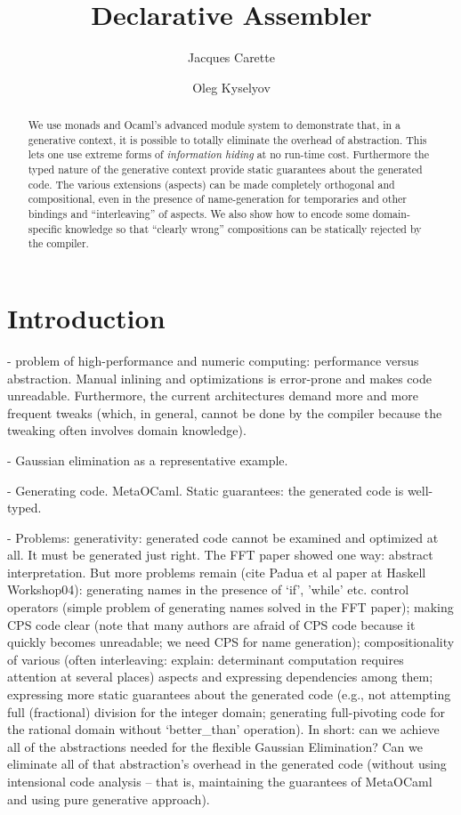 \documentclass[11pt]{llncs}
\title{Declarative Assembler}
\author{ Jacques Carette\inst{1}
 \and
 Oleg Kyselyov\inst{2}
}
\institute{McMaster University,
1280 Main St. West, Hamilton, Ontario Canada L8S 4K1
\and
Monterey, CA 93943}
\begin{document}
\maketitle

\begin{abstract}
We use monads and Ocaml's advanced module system to
demonstrate that, in a generative context, it is 
possible to totally eliminate the overhead of abstraction.
This lets one use extreme forms of \textit{information hiding}
at no run-time cost.  Furthermore the typed nature of
the generative context provide static guarantees about the 
generated code.  The various extensions
(aspects) can be made completely orthogonal and compositional,
even in the presence of name-generation for temporaries and
other bindings and ``interleaving'' of aspects.  We also
show how to encode some domain-specific knowledge so that
``clearly wrong'' compositions can be statically rejected by the
compiler.
\end{abstract}

\section{Introduction}

	- problem of high-performance and numeric computing:
performance versus abstraction. Manual inlining and optimizations is
error-prone and makes code unreadable. Furthermore, the current
architectures demand more and more frequent tweaks (which, in general,
cannot be done by the compiler because the tweaking often involves domain
knowledge).

	- Gaussian elimination as a representative example.

	- Generating code. MetaOCaml. Static guarantees: the generated
code is well-typed.

	- Problems: generativity: generated code cannot be examined
and optimized at all. It must be generated just right. The FFT paper
showed one way: abstract interpretation. But more problems remain
(cite Padua et al paper at Haskell Workshop04): generating names in
the presence of `if', 'while' etc. control operators (simple problem
of generating names solved in the FFT paper); making CPS code clear
(note that many authors are afraid of CPS code because it quickly
becomes unreadable; we need CPS for name generation); compositionality
of various (often interleaving: explain: determinant computation
requires attention at several places) aspects and expressing
dependencies among them; expressing more static guarantees about the
generated code (e.g., not attempting full (fractional) division for
the integer domain; generating full-pivoting code for the rational
domain without `better\_than' operation). In short: can we achieve all
of the abstractions needed for the flexible Gaussian Elimination? Can
we eliminate all of that abstraction's overhead in the generated code
(without using intensional code analysis -- that is, maintaining the
guarantees of MetaOCaml and using pure generative approach).
\end{document}
